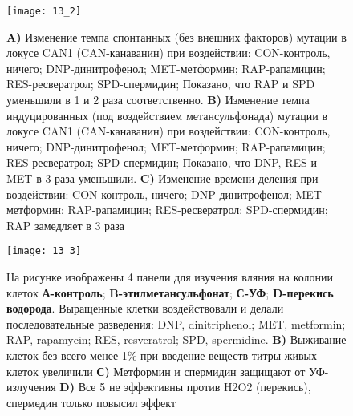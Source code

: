 \begin{figure}[H]
	\centering
	\texttt{[image: 13\_2]}
	\caption{\textbf{A)}	Изменение темпа спонтанных (без внешних факторов) мутации в локусе CAN1 (CAN-канаванин) при воздействии: CON-контроль, ничего; DNP-динитрофенол; MET-метформин; RAP-рапамицин; RES-ресвератрол; SPD-спермидин; Показано, что RAP и SPD уменьшили в 1 и 2 раза соответственно.
		\textbf{B)}	Изменение темпа индуцированных (под воздействием метансульфонада) мутации в локусе CAN1 (CAN-канаванин) при воздействии: CON-контроль, ничего; DNP-динитрофенол; MET-метформин; RAP-рапамицин; RES-ресвератрол; SPD-спермидин; Показано, что  DNP, RES и MET в 3 раза уменьшили.
		\textbf{C)}	Изменение времени деления при воздействии: CON-контроль, ничего; DNP-динитрофенол; MET-метформин; RAP-рапамицин; RES-ресвератрол; SPD-спермидин; RAP замедляет в 3 раза
	}
\end{figure}

\begin{figure}[H]
	\centering
	\texttt{[image: 13\_3]}
	\caption{На рисунке изображены 4 панели для изучения вляния на колонии клеток \textbf{А-контроль}; \textbf{B-этилметансульфонат}; \textbf{С-УФ}; \textbf{D-перекись водорода}. Выращенные клетки воздействовали и делали последовательные разведения: DNP, dinitriphenol; MET, metformin; RAP, rapamycin; RES, resveratrol; SPD, spermidine.
	\textbf{B)} Выживание клеток без всего менее 1\% при введение веществ титры живых клеток увеличили
	\textbf{С)} Метформин и спермидин защищают от УФ-излучения
	\textbf{D)} Все 5 не эффективны против H2O2 (перекись), спермедин только повысил эффект 
}
\end{figure}



